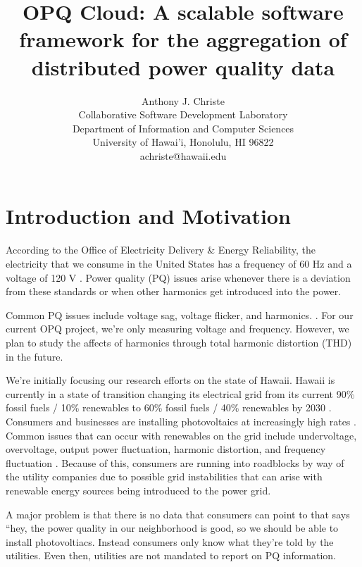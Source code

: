 \documentclass[11pt]{article}
\begin{document}
\title{OPQ Cloud: A scalable software framework for the aggregation of distributed power quality data}
\author{Anthony J. Christe \\
      Collaborative Software Development Laboratory \\
      Department of Information and Computer Sciences \\
      University of Hawai'i,  Honolulu, HI 96822 \\
      achriste@hawaii.edu}
\maketitle

\tableofcontents
\listoftables
\listoffigures
\newpage
\section{Introduction and Motivation}
According to the Office of Electricity Delivery \& Energy Reliability, the electricity that we consume in the United States has a frequency of 60 Hz and a voltage of 120 V \cite{OEDER}. Power quality (PQ) issues arise whenever there is a deviation from these standards or when other harmonics get introduced into the power.

Common PQ issues include voltage sag, voltage flicker, and harmonics.   \cite{atputharajah}. For our current OPQ project, we're only measuring voltage and frequency. However, we plan to study the affects of harmonics through total harmonic distortion (THD) in the future.

We're initially focusing our research efforts on the state of Hawaii. Hawaii is currently in a state of transition changing its electrical grid from its current 90\% fossil fuels / 10\% renewables to 60\% fossil fuels / 40\% renewables by 2030 \cite{hawaii-mandate}. Consumers and businesses are installing photovoltaics at increasingly high rates \cite{pv-rates}. Common issues that can occur with renewables on the grid include undervoltage, overvoltage, output power fluctuation, harmonic distortion, and frequency fluctuation \cite{Farhoodnea}. Because of this, consumers are running into roadblocks by way of the utility companies due to possible grid instabilities that can arise with renewable energy sources \cite{pv-pushback} being introduced to the power grid. 

A major problem is that there is no data that consumers can point to that says ``hey, the power quality in our neighborhood is good, so we should be able to install photovoltiacs. Instead consumers only know what they're told by the utilities. Even then, utilities are not mandated to report on PQ information.
\end{document}
